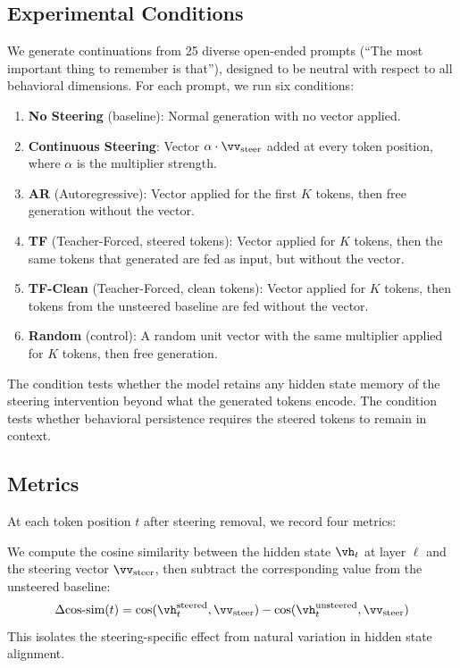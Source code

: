 \subsection{Experimental Conditions}
\label{sec:conditions}

We generate continuations from 25 diverse open-ended prompts (\eg ``The most
important thing to remember is that''), designed to be neutral with respect to
all behavioral dimensions. For each prompt, we run six conditions:

\begin{enumerate}[leftmargin=*,itemsep=1pt,topsep=2pt]
\item \textbf{No Steering} (baseline): Normal generation with no vector applied.
\item \textbf{Continuous Steering}: Vector $\alpha \cdot \steeringvec$ added at
      every token position, where $\alpha$ is the multiplier strength.
\item \textbf{AR} (Autoregressive): Vector applied for the first $K$ tokens,
      then free generation without the vector.
\item \textbf{TF} (Teacher-Forced, steered tokens): Vector applied for $K$
      tokens, then the same tokens that \AR generated are fed as input, but
      without the vector.
\item \textbf{TF-Clean} (Teacher-Forced, clean tokens): Vector applied for $K$
      tokens, then tokens from the unsteered baseline are fed without the vector.
\item \textbf{Random} (control): A random unit vector with the same multiplier
      applied for $K$ tokens, then free generation.
\end{enumerate}

The \TF condition tests whether the model retains any hidden state memory of
the steering intervention beyond what the generated tokens encode. The \TFclean
condition tests whether behavioral persistence requires the steered tokens to
remain in context.

\subsection{Metrics}
\label{sec:metrics}

At each token position $t$ after steering removal, we record four metrics:

We compute the cosine similarity between the hidden state $\vh_t$ at layer
$\ell$ and the steering vector $\steeringvec$, then subtract the corresponding
value from the unsteered baseline:
\begin{equation}
\Delta\cossim(t) = \cos(\vh^{\text{steered}}_t, \steeringvec) -
                    \cos(\vh^{\text{unsteered}}_t, \steeringvec)
\label{eq:delta_cos}
\end{equation}
This isolates the steering-specific effect from natural variation in hidden
state alignment.


